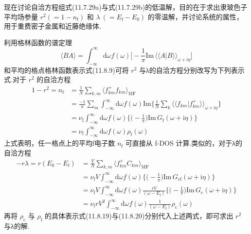 现在讨论自洽方程组式(11.7.29a)与式(11.7.29b)的低温解，目的在于求出隶玻色子平均场参量 $r^{2}(=1-n_{\mathrm{f}})$ 和 $\lambda\ (=E_{\mathrm{f}}-E_{0})$ 的零温解，并讨论系统的属性，用于重费密子金属和近藤绝缘体.

利用格林函数的谱定理
\begin{equation*}
  \langle BA\rangle=\int_{-\infty}^{\infty}\mathrm{d}\omega f(\omega)
  \biggl[-\frac{1}{\pi}\mathrm{Im}\,\langle\langle A|B\rangle\rangle_{\omega+\mathrm{i}\eta}\biggr]
\end{equation*}
和平均的格点格林函数表示式(11.8.9)可将 $r^{2}$ 与λ的自洽方程分别改写为下列表示式.对于 $r^{2}$ 的自洽方程
\begin{equation}
\begin{aligned}
  1-r^{2}=n_{\mathrm{f}}&=\frac{1}{N}\sum_{k,m}\langle f_{km}^{+}f_{km}\rangle_{\mathrm{MF}}\\
  &=\frac{-1}{\pi}\sum_{m}\int_{-\infty}^{\infty}\mathrm{d}\omega f(\omega)\mathrm{Im}
  \biggl\{\frac{1}{N}\sum_{k}\langle\langle f_{km}|f_{km}^{+}\rangle\rangle_{\omega+\mathrm{i}\eta}\biggr\}\\
  &=\nu_{\mathrm{f}}\int_{-\infty}^{\infty}\mathrm{d}\omega f(\omega)
  \biggl\{\biggl(-\frac{1}{\pi}\biggr)\mathrm{Im}\,G_{\mathrm{f}}(\omega+\mathrm{i}\eta)\biggr\}\\
  &=\nu_{\mathrm{f}}\int_{-\infty}^{\infty}\mathrm{d}\omega f(\omega)\rho_{\mathrm{f}}(\omega)
\end{aligned}
\end{equation}
上式表明，任一格点上的平均f电子数 $n_{\mathrm{f}}$ 可直接从 f-DOS 计算.类似的，对于λ的自洽方程
\begin{equation}
\begin{aligned}
  -r\lambda=r(E_{0}-E_{\mathrm{f}})&=\frac{V}{N}\sum_{k,m}\langle f_{km}^{+}C_{km}\rangle_{\mathrm{MF}}\\
  &=\nu_{\mathrm{f}}V\int_{-\infty}^{\infty}\mathrm{d}\omega f(\omega)
  \biggl\{\biggl(-\frac{1}{\pi}\biggr)\mathrm{Im}\,G_{\mathrm{cf}}(\omega+\mathrm{i}\eta)\biggr\}\\
  &=\nu_{\mathrm{f}}V\int_{-\infty}^{\infty}\mathrm{d}\omega f(\omega)\frac{rV}{(\omega-E_{\mathrm{f}})}
  \biggl\{\biggl(-\frac{1}{\pi}\biggr)\mathrm{Im}\,G_{\mathrm{c}}(\omega+\mathrm{i}\eta)\biggr\}\\
  &=\nu_{\mathrm{f}}rV^{2}\int_{-\infty}^{\infty}\mathrm{d}\omega f(\omega)
  \frac{1}{(\omega-E_{\mathrm{f}})}\rho_{\mathrm{c}}(\omega)
\end{aligned}
\end{equation}
再将 $\rho_{\mathrm{c}}$ 与 $\rho_{\mathrm{f}}$ 的具体表示式(11.8.19)与(11.8.20)分别代入上述两式，即可求出 $r^{2}$ 与λ的解.

